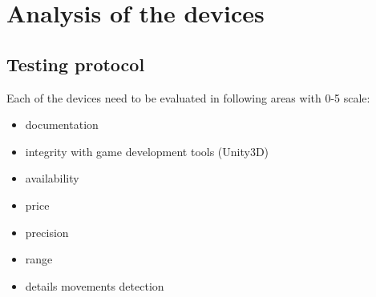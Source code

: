 \chapter{Analysis of the devices}

\section{Testing protocol}
Each of the devices need to be evaluated in following areas with 0-5 scale:
\begin{itemize}
\item documentation
\item integrity with game development tools (Unity3D)
\item availability
\item price
\item precision
\item range
\item details movements detection
\end{itemize}